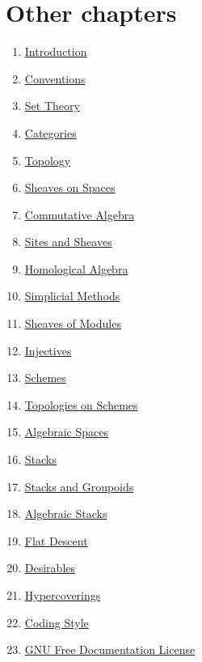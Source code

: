 \section{Other chapters}

\begin{multicols}{2}
\begin{enumerate}
\item \hyperref[introduction-section-overview]{Introduction}
\item \hyperref[conventions-section-comments]{Conventions}
\item \hyperref[sets-section-introduction]{Set Theory}
\item \hyperref[categories-section-introduction]{Categories}
\item \hyperref[topology-section-introduction]{Topology}
\item \hyperref[sheaves-section-introduction]{Sheaves on Spaces}
\item \hyperref[algebra-section-introduction]{Commutative Algebra}
\item \hyperref[sites-section-introduction]{Sites and Sheaves}
\item \hyperref[homology-section-introduction]{Homological Algebra}
\item \hyperref[simplicial-section-introduction]{Simplicial Methods}
\item \hyperref[modules-section-introduction]{Sheaves of Modules}
\item \hyperref[injectives-section-introduction]{Injectives}
\item \hyperref[schemes-section-introduction]{Schemes}
\item \hyperref[etale-section-introduction]{Topologies on Schemes}
\item \hyperref[spaces-section-introduction]{Algebraic Spaces}
\item \hyperref[stacks-section-introduction]{Stacks}
\item \hyperref[stacks-groupoids-section-introduction]{Stacks and Groupoids}
\item \hyperref[algebraic-section-introduction]{Algebraic Stacks}
\item \hyperref[flat-section-introduction]{Flat Descent}
\item \hyperref[desirables-section-introduction]{Desirables}
\item \hyperref[hypercovering-section-introduction]{Hypercoverings}
\item \hyperref[coding-section-style]{Coding Style}
\item \hyperref[fdl-version]{GNU Free Documentation License}
\end{enumerate}
\end{multicols}
